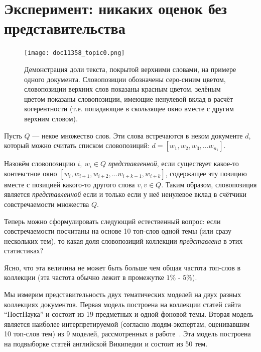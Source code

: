 \section{Эксперимент: никаких оценок без представительства}



\begin{figure}
        \texttt{[image: doc11358\_topic0.png]} %
    \caption{Демонстрация доли текста, покрытой верхними словами, на примере одного документа. Словопозиции обозначены серо-синим цветом, словопозиции верхних слов показаны красным цветом, зелёным цветом показаны словопозиции, имеющие ненулевой вклад в расчёт когерентности (т.е. попадающие в скользящее окно вместе с другим верхним словом).}
\label{fig:ch3_doc_compound}
\end{figure}


Пусть $Q$ --- некое множество слов. Эти слова встречаются в неком документе $d$, который можно считать списком словопозиций: $d = [w_1, w_2, w_3, \dots w_{n_1}]$.

Назовём словопозицию $i, ~w_i \in Q$ \textit{представленной}, если существует какое-то контекстное окно $[w_i, w_{i+1}, w_{i+2}, \dots w_{i+k-1}, w_{i+k}]$, содержащее эту позицию вместе с позицией какого-то другого слова $v, v \in Q$. Таким образом, словопозиция является \textit{представленной} если и только если у неё ненулевое вклад в счётчики совстречаемости множества $Q$.

Теперь можно сформулировать следующий естественный вопрос: если совстречаемости посчитаны на основе 10 топ-слов одной темы (или сразу нескольких тем), то какая доля словопозиций коллекции \textit{представлена} в этих статистиках?

Ясно, что эта величина не может быть больше чем общая частота топ-слов в коллекции (эта частота обычно лежит в промежутке $1\%$ - $5\%$).


Мы измерим представительность двух тематических моделей на двух разных коллекциях документов. Первая модель построена на коллекции статей сайта ``ПостНаука'' и состоит из 19 предметных и одной фоновой темы. Вторая модель является наиболее интерпретируемой (согласно людям-экспертам, оценивавшим 10 топ-слов тем) из 9 моделей, рассмотренных в работе~\cite{rtl}. Эта модель построена на подвыборке статей английской Википедии и состоит из 50 тем.

